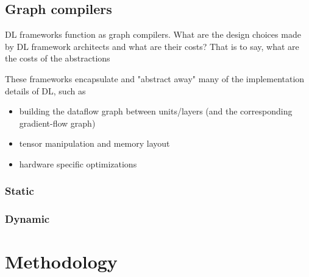 \documentclass[sigconf]{acmart}
\begin{document}




\subsection{Graph compilers}\label{subsec:graph-compilers}

DL frameworks function as graph compilers.
What are the design choices made by DL framework architects and what are their costs?
That is to say, what are the costs of the abstractions

These frameworks encapsulate and "abstract away" many of the implementation details of DL, such as
\begin{itemize}
  \item building the dataflow graph between units/layers (and the corresponding gradient-flow graph)
  \item tensor manipulation and memory layout
  \item hardware specific optimizations
\end{itemize}

\subsubsection{Static}

\subsubsection{Dynamic}

\section{Methodology}\label{sec:methodology}
\end{document}

